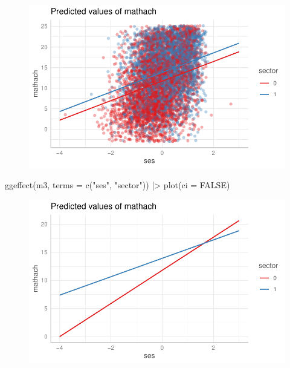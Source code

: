 \documentclass[
  letterpaper,
  DIV=11,
  numbers=noendperiod]{scrreprt}
\newenvironment{Shaded}{\begin{snugshade}}{\end{snugshade}}
\newcommand{\AttributeTok}[1]{\textcolor[rgb]{0.49,0.56,0.16}{#1}}
\newcommand{\ConstantTok}[1]{\textcolor[rgb]{0.53,0.00,0.00}{#1}}
\newcommand{\FunctionTok}[1]{\textcolor[rgb]{0.02,0.16,0.49}{#1}}
\newcommand{\NormalTok}[1]{\textcolor[rgb]{0.00,0.44,0.13}{#1}}
\newcommand{\SpecialCharTok}[1]{\textcolor[rgb]{0.25,0.44,0.63}{#1}}
\newcommand{\StringTok}[1]{\textcolor[rgb]{0.25,0.44,0.63}{#1}}
\begin{document}
\begin{figure}[H]

{\centering \includegraphics{ggeffects_files/figure-pdf/unnamed-chunk-6-1.pdf}

}

\end{figure}

\begin{Shaded}
\begin{Highlighting}[]
\FunctionTok{ggeffect}\NormalTok{(m3, }\AttributeTok{terms =} \FunctionTok{c}\NormalTok{(}\StringTok{"ses"}\NormalTok{, }\StringTok{"sector"}\NormalTok{)) }\SpecialCharTok{|\textgreater{}} 
  \FunctionTok{plot}\NormalTok{(}\AttributeTok{ci =} \ConstantTok{FALSE}\NormalTok{)}
\end{Highlighting}
\end{Shaded}

\begin{figure}[H]

{\centering \includegraphics{ggeffects_files/figure-pdf/unnamed-chunk-6-2.pdf}

}

\end{figure}
\end{document}
